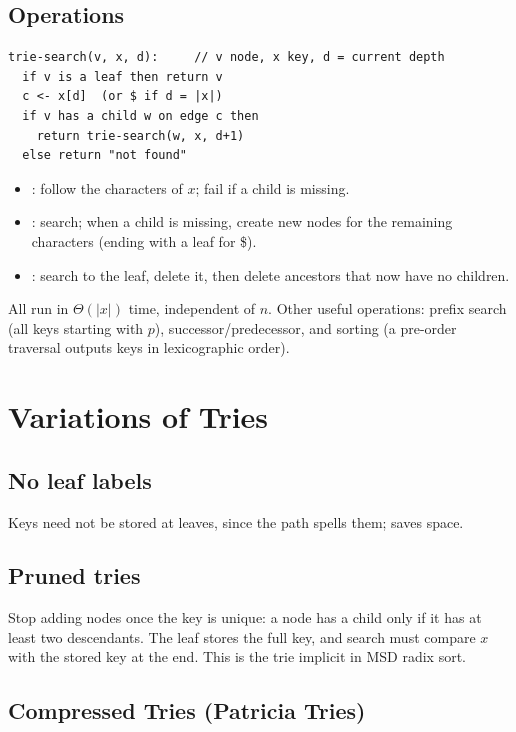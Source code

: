 \subsection{Operations}

\begin{lstlisting}
trie-search(v, x, d):     // v node, x key, d = current depth
  if v is a leaf then return v
  c <- x[d]  (or $ if d = |x|)
  if v has a child w on edge c then
    return trie-search(w, x, d+1)
  else return "not found"
\end{lstlisting}

\begin{itemize}
  \item {}: follow the characters of $x$; fail if a child is missing.
  \item {}: search; when a child is missing, create new nodes for
        the remaining characters (ending with a leaf for \$).
  \item {}: search to the leaf, delete it, then delete ancestors
        that now have no children.
\end{itemize}
All run in $\Theta(|x|)$ time, independent of $n$. Other useful operations:
prefix search (all keys starting with $p$), successor/predecessor, and sorting
(a pre-order traversal outputs keys in lexicographic order).

\section{Variations of Tries}

\subsection{No leaf labels}
Keys need not be stored at leaves, since the path spells them; saves space.

\subsection{Pruned tries}
Stop adding nodes once the key is unique: a node has a child only if it has at
least two descendants. The leaf stores the full key, and search must compare
$x$ with the stored key at the end. This is the trie implicit in MSD radix sort.

\subsection{Compressed Tries (Patricia Tries)}

